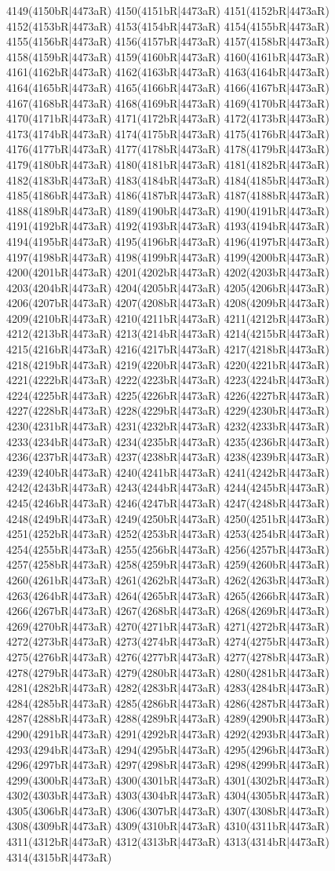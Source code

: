 4149(4150bR|4473aR) 4150(4151bR|4473aR) 4151(4152bR|4473aR) 4152(4153bR|4473aR) 4153(4154bR|4473aR) 4154(4155bR|4473aR) 4155(4156bR|4473aR) 4156(4157bR|4473aR) 4157(4158bR|4473aR) 4158(4159bR|4473aR) 4159(4160bR|4473aR) 4160(4161bR|4473aR) 4161(4162bR|4473aR) 4162(4163bR|4473aR) 4163(4164bR|4473aR) 4164(4165bR|4473aR) 4165(4166bR|4473aR) 4166(4167bR|4473aR) 4167(4168bR|4473aR) 4168(4169bR|4473aR) 4169(4170bR|4473aR) 4170(4171bR|4473aR) 4171(4172bR|4473aR) 4172(4173bR|4473aR) 4173(4174bR|4473aR) 4174(4175bR|4473aR) 4175(4176bR|4473aR) 4176(4177bR|4473aR) 4177(4178bR|4473aR) 4178(4179bR|4473aR) 4179(4180bR|4473aR) 4180(4181bR|4473aR) 4181(4182bR|4473aR) 4182(4183bR|4473aR) 4183(4184bR|4473aR) 4184(4185bR|4473aR) 4185(4186bR|4473aR) 4186(4187bR|4473aR) 4187(4188bR|4473aR) 4188(4189bR|4473aR) 4189(4190bR|4473aR) 4190(4191bR|4473aR) 4191(4192bR|4473aR) 4192(4193bR|4473aR) 4193(4194bR|4473aR) 4194(4195bR|4473aR) 4195(4196bR|4473aR) 4196(4197bR|4473aR) 4197(4198bR|4473aR) 4198(4199bR|4473aR) 4199(4200bR|4473aR) 4200(4201bR|4473aR) 4201(4202bR|4473aR) 4202(4203bR|4473aR) 4203(4204bR|4473aR) 4204(4205bR|4473aR) 4205(4206bR|4473aR) 4206(4207bR|4473aR) 4207(4208bR|4473aR) 4208(4209bR|4473aR) 4209(4210bR|4473aR) 4210(4211bR|4473aR) 4211(4212bR|4473aR) 4212(4213bR|4473aR) 4213(4214bR|4473aR) 4214(4215bR|4473aR) 4215(4216bR|4473aR) 4216(4217bR|4473aR) 4217(4218bR|4473aR) 4218(4219bR|4473aR) 4219(4220bR|4473aR) 4220(4221bR|4473aR) 4221(4222bR|4473aR) 4222(4223bR|4473aR) 4223(4224bR|4473aR) 4224(4225bR|4473aR) 4225(4226bR|4473aR) 4226(4227bR|4473aR) 4227(4228bR|4473aR) 4228(4229bR|4473aR) 4229(4230bR|4473aR) 4230(4231bR|4473aR) 4231(4232bR|4473aR) 4232(4233bR|4473aR) 4233(4234bR|4473aR) 4234(4235bR|4473aR) 4235(4236bR|4473aR) 4236(4237bR|4473aR) 4237(4238bR|4473aR) 4238(4239bR|4473aR) 4239(4240bR|4473aR) 4240(4241bR|4473aR) 4241(4242bR|4473aR) 4242(4243bR|4473aR) 4243(4244bR|4473aR) 4244(4245bR|4473aR) 4245(4246bR|4473aR) 4246(4247bR|4473aR) 4247(4248bR|4473aR) 4248(4249bR|4473aR) 4249(4250bR|4473aR) 4250(4251bR|4473aR) 4251(4252bR|4473aR) 4252(4253bR|4473aR) 4253(4254bR|4473aR) 4254(4255bR|4473aR) 4255(4256bR|4473aR) 4256(4257bR|4473aR) 4257(4258bR|4473aR) 4258(4259bR|4473aR) 4259(4260bR|4473aR) 4260(4261bR|4473aR) 4261(4262bR|4473aR) 4262(4263bR|4473aR) 4263(4264bR|4473aR) 4264(4265bR|4473aR) 4265(4266bR|4473aR) 4266(4267bR|4473aR) 4267(4268bR|4473aR) 4268(4269bR|4473aR) 4269(4270bR|4473aR) 4270(4271bR|4473aR) 4271(4272bR|4473aR) 4272(4273bR|4473aR) 4273(4274bR|4473aR) 4274(4275bR|4473aR) 4275(4276bR|4473aR) 4276(4277bR|4473aR) 4277(4278bR|4473aR) 4278(4279bR|4473aR) 4279(4280bR|4473aR) 4280(4281bR|4473aR) 4281(4282bR|4473aR) 4282(4283bR|4473aR) 4283(4284bR|4473aR) 4284(4285bR|4473aR) 4285(4286bR|4473aR) 4286(4287bR|4473aR) 4287(4288bR|4473aR) 4288(4289bR|4473aR) 4289(4290bR|4473aR) 4290(4291bR|4473aR) 4291(4292bR|4473aR) 4292(4293bR|4473aR) 4293(4294bR|4473aR) 4294(4295bR|4473aR) 4295(4296bR|4473aR) 4296(4297bR|4473aR) 4297(4298bR|4473aR) 4298(4299bR|4473aR) 4299(4300bR|4473aR) 4300(4301bR|4473aR) 4301(4302bR|4473aR) 4302(4303bR|4473aR) 4303(4304bR|4473aR) 4304(4305bR|4473aR) 4305(4306bR|4473aR) 4306(4307bR|4473aR) 4307(4308bR|4473aR) 4308(4309bR|4473aR) 4309(4310bR|4473aR) 4310(4311bR|4473aR) 4311(4312bR|4473aR) 4312(4313bR|4473aR) 4313(4314bR|4473aR) 4314(4315bR|4473aR) 